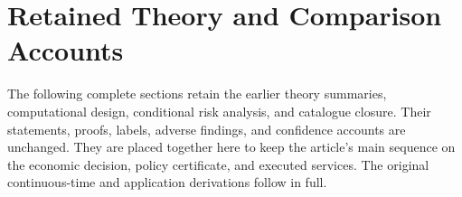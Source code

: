\section{Retained Theory and Comparison Accounts}\label{app:r21retained}
The following complete sections retain the earlier theory summaries,
computational design, conditional risk analysis, and catalogue closure.
Their statements, proofs, labels, adverse findings, and confidence accounts
are unchanged. They are placed together here to keep the article's main
sequence on the economic decision, policy certificate, and executed services.
The original continuous-time and application derivations follow in full.

